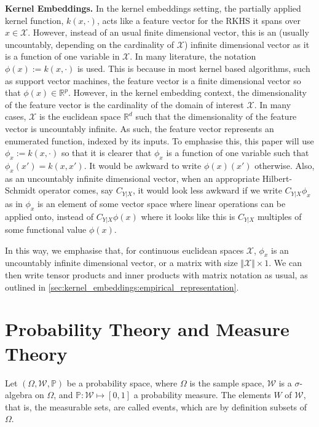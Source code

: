 \documentclass[twoside]{article} \usepackage{aistats2017}
\theoremstyle{definition}
\newcommand{\rv}[1]{{#1}}
\newcommand{\cardX}{\Vert \mathcal{X} \Vert}
\begin{document}
	\textbf{Kernel Embeddings.} In the kernel embeddings setting, the partially applied kernel function, $k(x, \cdot)$, acts like a feature vector for the RKHS it spans over $x \in \mathcal{X}$. However, instead of an usual finite dimensional vector, this is an (usually uncountably, depending on the cardinality of $\mathcal{X}$) infinite dimensional vector as it is a function of one variable in $\mathcal{X}$. In many literature, the notation $\phi(x) := k(x, \cdot)$ is used. This is because in most kernel based algorithms, such as support vector machines, the feature vector is a finite dimensional vector so that $\phi(x) \in \mathbb{R}^{p}$. However, in the kernel embedding context, the dimensionality of the feature vector is the cardinality of the domain of interest $\mathcal{X}$. In many cases, $\mathcal{X}$ is the euclidean space $\mathbb{R}^{d}$ such that the dimensionality of the feature vector is uncountably infinite. As such, the feature vector represents an enumerated function, indexed by its inputs. To emphasise this, this paper will use $\phi_{x} := k(x, \cdot)$ so that it is clearer that $\phi_{x}$ is a function of one variable such that $\phi_{x}(x') = k(x, x')$. It would be awkward to write $\phi(x)(x')$ otherwise. Also, as an uncountably infinite dimensional vector, when an appropriate Hilbert-Schmidt operator comes, say $C_{\rv{Y} | \rv{X}}$, it would look less awkward if we write $C_{\rv{Y} | \rv{X}} \phi_{x}$ as in $\phi_{x}$ is an element of some vector space where linear operations can be applied onto, instead of $C_{\rv{Y} | \rv{X}} \phi(x)$ where it looks like this is $C_{\rv{Y} | \rv{X}}$ multiples of some functional value $\phi(x)$.
	
	In this way, we emphasise that, for continuous euclidean spaces $\mathcal{X}$, $\phi_{x}$ is an uncountably infinite dimensional vector, or a matrix with size $\cardX \times 1$. We can then write tensor products and inner products with matrix notation as usual, as outlined in \cref{sec:kernel_embeddings:empirical_representation}.
	
\section{Probability Theory and Measure Theory}
\label{sec:probability_theory}

	Let $(\Omega, \mathcal{W}, \mathbb{P})$ be a probability space, where $\Omega$ is the sample space, $\mathcal{W}$ is a $\sigma$-algebra on $\Omega$, and $\mathbb{P} : \mathcal{W} \mapsto [0, 1]$ a probability measure. The elements $W$ of $\mathcal{W}$, that is, the measurable sets, are called events, which are by definition subsets of $\Omega$.
	
\end{document}
